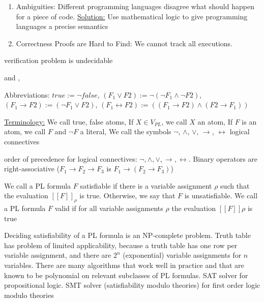 \documentclass[landscape, a4paper]{article}
\begin{document}
\begin{minipage}[t]{0.2\linewidth}
\begin{betterlist}
\begin{enumerate}
			\item \alert{Ambiguities:} Different programming languages disagree what should happen for a piece of code. \underline{Solution:} Use mathematical logic to give programming languages a precise semantics
			\item \alert{Correctness Proofs are Hard to Find:} We cannot track all executions.
		\end{enumerate}
		\item verification problem is undecidable
	\end{betterlist}
	  
	\begin{betterlist}
		\item {} and , 
		\begin{betterlist}
			\item \alert{Abbreviations:} $true := \neg false$, $(F_1 \lor F2 ) := \neg (\neg F_1 \land \neg F2)$, $(F_1 \rightarrow F2) := (\neg F_1 \lor F2)$, $(F_1 \leftrightarrow F2) := ((F_1 \rightarrow F2) \land (F2 \rightarrow F_1))$
			\item \underline{Terminology:} We call true, false \alert{atoms}, If $X \in V_{PL}$, we call $X$ an \alert{atom}, If $F$ is an atom, we call $F$ and $\neg F$ a \alert{literal}, We call the symbols $\neg$, $\wedge$, $\vee$, $\rightarrow$, $\leftrightarrow$ \alert{logical connectives}
			\item order of \alert{precedence} for logical connectives: $\neg, \land, \lor, \rightarrow, \leftrightarrow$. Binary operators are \alert{right-associative} ($F_1 \rightarrow F_2 \rightarrow F_3$ is $F_1 \rightarrow (F_2 \rightarrow F_3 )$)
		\end{betterlist}
		\item We call a PL formula $F$ \alert{satisfiable} if there is a variable assignment $\rho$ such that the evaluation $[[F]]_\rho$ is true. Otherwise, we say that $F$ is \alert{unsatisfiable}. We call a PL formula $F$ \alert{valid} if for all variable assignments $\rho$ the evaluation $[[F]]\rho$ is true
		\begin{betterlist}
			\item Deciding \alert{satisfiability} of a PL formula is an \alert{NP-complete} problem. \alert{Truth table} has problem of limited applicability, because a truth table has one row per variable assignment, and there are $2^n$ (exponential) variable assignments for $n$ variables. There are many algorithms that work well in practice and that are known to be \alert{polynomial} on relevant \alert{subclasses of PL formulas}. \alert{SAT solver} for propositional logic. \alert{SMT solver} (satisfiability modulo theories) for first order logic modulo theories

\end{betterlist}
\end{betterlist}
\end{minipage}
\end{document}
